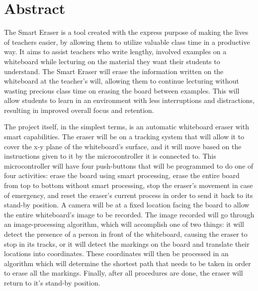  \section*{Abstract}

 The Smart Eraser is a tool created with the express purpose of making the lives of teachers easier, by allowing them to utilize valuable class time in a productive way. It aims to assist teachers who write lengthy, involved examples on a whiteboard while lecturing on the material they want their students to understand. The Smart Eraser will erase the information written on the whiteboard at the teacher's will, allowing them to continue lecturing without wasting precious class time on erasing the board between examples. This will allow students to learn in an environment with less interruptions and distractions, resulting in improved overall focus and retention. \par
 \setlength{\parindent}{2.5ex} The project itself, in the simplest terms, is an automatic whiteboard eraser with smart capabilities. The eraser will be on a tracking system that will allow it to cover the x-y plane of the whiteboard's surface, and it will move based on the instructions given to it by the microcontroller it is connected to. This microcontroller will have four push-buttons that will be programmed to do one of four activities: erase the board using smart processing, erase the entire board from top to bottom without smart processing, stop the eraser's movement in case of emergency, and reset the eraser's current process in order to send it back to its stand-by position. A camera will be at a fixed location facing the board to allow the entire whiteboard's image to be recorded. The image recorded will go through an image-processing algorithm, which will accomplish one of two things: it will detect the presence of a person in front of the whiteboard, causing the eraser to stop in its tracks, or it will detect the markings on the board and translate their locations into coordinates. These coordinates will then be processed in an algorithm which will determine the shortest path that needs to be taken in order to erase all the markings. Finally, after all procedures are done, the eraser will return to it's stand-by position.
 
\newpage
\setcounter{page}{1}
